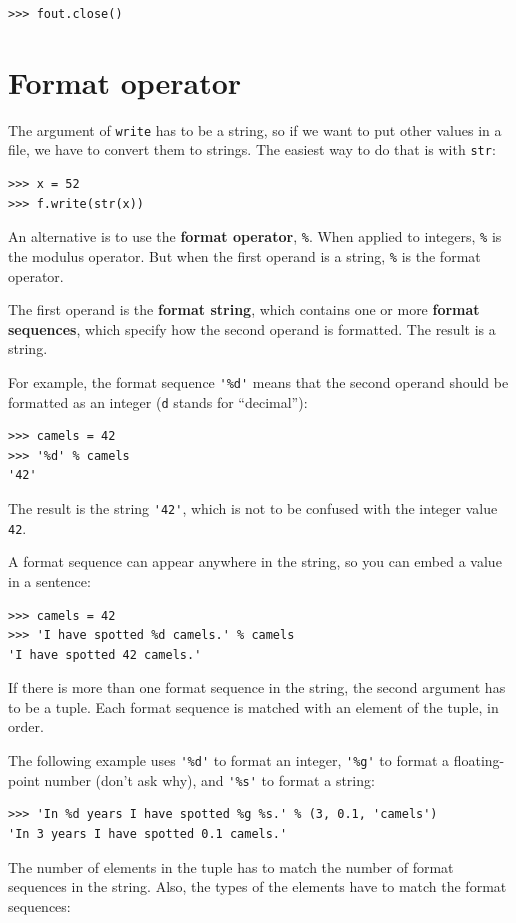 \documentclass[10pt]{book}
\begin{document}
\begin{CJK}{UTF8}{gbsn}
\begin{verbatim}
>>> fout.close()
\end{verbatim}
%


\section{Format operator}

The argument of {\tt write} has to be a string, so if we want
to put other values in a file, we have to convert them to
strings.  The easiest way to do that is with {\tt str}:

\begin{verbatim}
>>> x = 52
>>> f.write(str(x))
\end{verbatim}
%
An alternative is to use the {\bf format operator}, {\tt \%}.  When
applied to integers, {\tt \%} is the modulus operator.  But
when the first operand is a string, {\tt \%} is the format operator.

The first operand is the {\bf format string}, which contains
one or more {\bf format sequences}, which
specify how
the second operand is formatted.  The result is a string.

For example, the format sequence \verb"'%d'" means that
the second operand should be formatted as an
integer ({\tt d} stands for ``decimal''):

\begin{verbatim}
>>> camels = 42
>>> '%d' % camels
'42'
\end{verbatim}
%
The result is the string \verb"'42'", which is not to be confused
with the integer value {\tt 42}.

A format sequence can appear anywhere in the string,
so you can embed a value in a sentence:

\begin{verbatim}
>>> camels = 42
>>> 'I have spotted %d camels.' % camels
'I have spotted 42 camels.'
\end{verbatim}
%
If there is more than one format sequence in the string,
the second argument has to be a tuple.  Each format sequence is
matched with an element of the tuple, in order.

The following example uses \verb"'%d'" to format an integer,
\verb"'%g'" to format
a floating-point number (don't ask why), and \verb"'%s'" to format
a string:

\begin{verbatim}
>>> 'In %d years I have spotted %g %s.' % (3, 0.1, 'camels')
'In 3 years I have spotted 0.1 camels.'
\end{verbatim}
%
The number of elements in the tuple has to match the number
of format sequences in the string.  Also, the types of the
elements have to match the format sequences:


\end{CJK}
\end{document}
